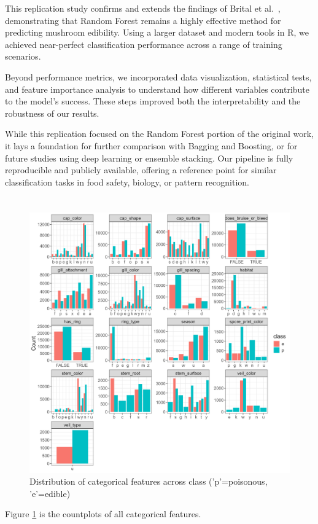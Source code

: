 \documentclass[a4paper,11pt]{article}
\begin{document}
This replication study confirms and extends the findings of Brital et al.~\citep{brital2019edibility}, demonstrating that Random Forest remains a highly effective method for predicting mushroom edibility. Using a larger dataset and modern tools in R, we achieved near-perfect classification performance across a range of training scenarios.

Beyond performance metrics, we incorporated data visualization, statistical tests, and feature importance analysis to understand how different variables contribute to the model’s success. These steps improved both the interpretability and the robustness of our results.

While this replication focused on the Random Forest portion of the original work, it lays a foundation for further comparison with Bagging and Boosting, or for future studies using deep learning or ensemble stacking. Our pipeline is fully reproducible and publicly available, offering a reference point for similar classification tasks in food safety, biology, or pattern recognition.




\appendix 
\setcounter{section}{0}
\def\thesection{Appendix}
\section{}\label{Appendix}
\def\thesubsection{\Alph{subsection}}

\begin{figure}[h]
    \centering
    \includegraphics[width=1\textwidth]{Figure2.1-count-plots-full.png}
    \caption{Distribution of categorical features across class ('p'=poisonous, 'e'=edible)}
    \label{fig:countfull}
\end{figure}

Figure \ref{fig:countfull} is the countplots of all categorical features.
\end{document}

